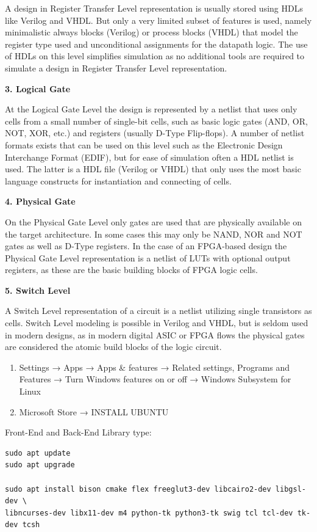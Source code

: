 \documentclass[
]{article}
\begin{document}
A design in Register Transfer Level representation is usually stored
using HDLs like Verilog and VHDL. But only a very limited subset of
features is used, namely minimalistic always blocks (Verilog) or process
blocks (VHDL) that model the register type used and unconditional
assignments for the datapath logic. The use of HDLs on this level
simplifies simulation as no additional tools are required to simulate a
design in Register Transfer Level representation.

\textbf{3. Logical Gate}

At the Logical Gate Level the design is represented by a netlist that
uses only cells from a small number of single-bit cells, such as basic
logic gates (AND, OR, NOT, XOR, etc.) and registers (usually D-Type
Flip-flops). A number of netlist formats exists that can be used on this
level such as the Electronic Design Interchange Format (EDIF), but for
ease of simulation often a HDL netlist is used. The latter is a HDL file
(Verilog or VHDL) that only uses the most basic language constructs for
instantiation and connecting of cells.

\textbf{4. Physical Gate}

On the Physical Gate Level only gates are used that are physically
available on the target architecture. In some cases this may only be
NAND, NOR and NOT gates as well as D-Type registers. In the case of an
FPGA-based design the Physical Gate Level representation is a netlist of
LUTs with optional output registers, as these are the basic building
blocks of FPGA logic cells.

\textbf{5. Switch Level}

A Switch Level representation of a circuit is a netlist utilizing single
transistors as cells. Switch Level modeling is possible in Verilog and
VHDL, but is seldom used in modern designs, as in modern digital ASIC or
FPGA flows the physical gates are considered the atomic build blocks of
the logic circuit.

\begin{enumerate}
\def\labelenumi{\arabic{enumi}.}
\item
  Settings → Apps → Apps \& features → Related settings, Programs and
  Features → Turn Windows features on or off → Windows Subsystem for
  Linux
\item
  Microsoft Store → INSTALL UBUNTU
\end{enumerate}

Front-End and Back-End Library type:

\begin{verbatim}
sudo apt update
sudo apt upgrade

sudo apt install bison cmake flex freeglut3-dev libcairo2-dev libgsl-dev \
libncurses-dev libx11-dev m4 python-tk python3-tk swig tcl tcl-dev tk-dev tcsh
\end{verbatim}
\end{document}
